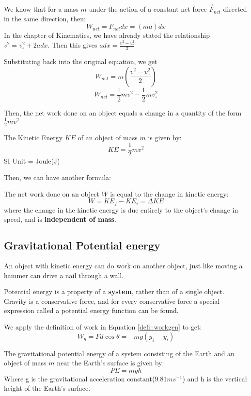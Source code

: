 We know that for a mass $m$ under the action of a constant net force $\vec{F}_{net}$ directed in the same direction, then:
$$W_{net} = F_{net} d x = (ma)d x$$
In the chapter of Kinematics, we have already stated the relationship $v^2 = v_\circ^2 + 2ad x$.
Then this gives $ad x = \frac{v^2-v_\circ^2}{2}$

Substituting back into the original equation, we get
$$W_{net} = m \left(\frac{v^2-v_\circ^2}{2} \right)$$
$$W_{net} = \frac{1}{2}mv^2 - \frac{1}{2}mv_\circ^2$$

Then, the net work done on an object equals a change in a quantity of the form $\frac{1}{2}mv^2$

\begin{form}
The Kinetic Energy $KE$ of an object of mass $m$ is given by:
$$KE = \frac{1}{2}mv^2$$
SI Unit = Joule(J)
\end{form}

Then, we can have another formula:
\begin{form}
The net work done on an object $W$ is equal to the change in kinetic energy:
$$W=KE_f - KE_i = \Delta KE$$
where the change in the kinetic energy is due entirely to the object's change in speed, and is \textbf{independent of mass}.
\end{form}

\subsection{Gravitational Potential energy}
An object with kinetic energy can do work on another object, just like moving a hammer can drive a nail through a wall. 

Potential energy is a property of a \textbf{system}, rather than of a single object. Gravity is a conservative force, and for every conservative force a special expression called a potential energy function can be found.

We apply the definition of work in Equation \ref{defi::workgen} to get:
$$W_g = Fd \cos \theta = -mg(y_f - y_i)$$

\begin{form}
The gravitational potential energy of a system consisting of the Earth and an object of mass $m$ near the Earth's surface is given by:
$$ PE = mgh$$
Where g is the gravitational acceleration constant($9.81ms^{-1}$) and h is the vertical height of the Earth's surface.
\end{form}

